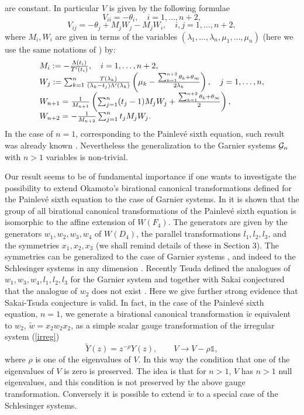 \documentclass[12pt]{article}
\newcommand{\ID}{\mathbb{1}}
\theoremstyle{definition}
\theoremstyle{theorem}
\begin{document}
are constant. In particular $V$ is given by the 
following  formulae
\begin{equation}
V_{ii} = -\theta_i, \quad i=1,\dots,n+2,
\label{cV1}\end{equation}
\begin{equation}
V_{ij} = -\theta_j+ M_j W_j-M_j W_i,\quad i,j=1,\dots,n+2,
\label{off}\end{equation}
where $M_i, W_i$ are given in terms of the variables 
$(\lambda_1,\dots,\lambda_n,\mu_1,\dots,\mu_n)$
(here we use the same notations of \cite{IKSY}) by:
\begin{equation}
\begin{array}{l}
M_i:=-{\Lambda(t_i)\over T'(t_i)}, \quad i=1,\dots,n+2,\\
W_j:=\sum_{k=1}^n {T(\lambda_k)\over(\lambda_k-t_j)\Lambda'(\lambda_k)} 
\left(\mu_k-{\sum_{k=1}^{n+2}\theta_k+\theta_\infty
\over2\lambda_k}\right), \quad j=1,\dots,n,\\
W_{n+1}={1\over M_{n+1}}\left(\sum_{j=1}^n (t_j-1)M_j W_j+
{\sum_{k=1}^{n+2}\theta_k+\theta_\infty\over2}\right),\\
W_{n+2}=-{1\over M_{n+2}}\sum_{j=1}^n t_j M_j W_j.\\
\end{array}
\label{forj}
\end{equation}
In the case of $n=1$, corresponding to the Painlev\'e sixth
equation, such result was already known \cite{Hr,M3}. Nevertheless 
the generalization to the Garnier systems ${\cal G}_n$ with $n>1$ variables
is non-trivial. 

Our result seems to be of fundamental importance if one wants to
investigate the possibility to extend Okamoto's birational canonical 
transformations defined for the Painlev\'e sixth equation to the case of 
Garnier systems. In \cite{Ok2} it is shown that the group of all birational 
canonical transformations of the Painlev\'e sixth equation is isomorphic to
the affine extension of $W(F_4)$. The generators are given by the 
generators $w_1,w_2,w_3,w_4$ of $W(D_4)$, the parallel transformations 
$l_1,l_2,l_3$, and the symmetries $x_1,x_2, x_3$ (we shall remind 
details of these in Section 3). The symmetries can be generalized to
the case of Garnier systems \cite{IKSY}, and indeed to the Schlesinger systems
in any dimension \cite{DM1}. Recently Tsuda \cite{Ts} defined 
the analogues of $w_1,w_3,w_4,l_1,l_2,l_3$ for the Garnier system and together
with Sakai conjectured that the analogue of $w_2$ does not exist \cite{ST}. 
Here we give further strong evidence that Sakai-Tsuda conjecture is valid.
In fact, in the case of the Painlev\'e sixth equation, $n=1$, we generate 
a birational canonical transformation $\tilde w$ equivalent to $w_2$,
$\tilde w= x_2 w_2 x_2$, as a simple scalar gauge transformation of the 
irregular system (\ref{irreg})
$$
\tilde Y(z)=z^{-\rho} Y(z),\qquad V\to V-\rho\ID,
$$
where $\rho$ is one of the eigenvalues of $V$. In this way the condition
that one of the eigenvalues of $V$ is zero is preserved. The idea is that 
for $n>1$, $V$ has $n>1$ null eigenvalues, and this condition is not 
preserved by the above gauge transformation. Conversely it is possible
to extend $\tilde w$ to a special case of the Schlesinger systems.
\end{document}
